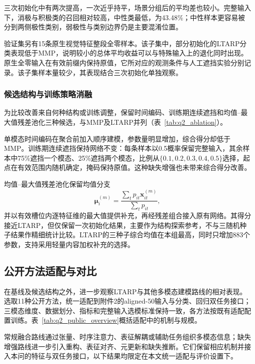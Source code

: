 \documentclass[UTF8,a4paper,11pt]{ctexart}
\newcommand{\QTwoParagraph}{\par\noindent\hspace*{2em}}
\newcounter{q2algorithm}
\begin{document}
\QTwoParagraph 三次初始化中有两次提高，一次近乎持平，场景分组后的平均差也较小。完整输入下，消极与积极类的召回相对较高，中性类最低，为43.48\%；中性样本更容易被分到两侧极性类别，弱极性与类别边界仍是主要混淆位置。

\QTwoParagraph 验证集另有15条原生视觉特征整段全零样本。该子集中，部分初始化的LTARP分类表现低于MMP，说明较小的总体平均收益可以与特殊输入上的退化同时出现。原生全零输入在有效前缀内保持原值，它所对应的观测条件与人工遮挡实验分别记录。该子集样本量较少，其表现结合三次初始化单独观察。

\subsubsection{候选结构与训练策略消融}
\QTwoParagraph 为比较改善来自何种结构或训练调整，保留时间编码、训练期连续遮挡和均值--最大值残差池化三种候选，与MMP及LTARP并列（表~\ref{tab:q2_ablation}）。



\QTwoParagraph 单模态时间编码在聚合前加入顺序建模，参数量明显增加，综合得分却低于MMP。训练期连续遮挡保持网络不变：每条样本以0.5概率保留完整输入，其余样本中75\%遮挡一个模态、25\%遮挡两个模态，比例从$\{0.1,0.2,0.3,0.4,0.5\}$选择，起点在有效范围内随机确定，掩码保持原值。这种缺失增强也未带来综合得分改善。

\QTwoParagraph 均值--最大值残差池化保留均值分支
\begin{equation}
\boldsymbol\mu_i^{(m)} = \frac{\sum_t p_{it}\mathbf x_{it}^{(m)}}{\sum_t p_{it}},
\end{equation}
并以有效槽位内逐特征维的最大值提供补充，再经残差组合接入原有网络。其得分接近LTARP，但仅保留一次初始化结果，主要作为结构探索参考，不与三随机种子结果作精细统计比较。LTARP的三种子综合均值在本组最高，同时只增加883个参数，支持采用轻量内容加权补充的选择。
\FloatBarrier

\subsection{公开方法适配与对比}\label{subsec:q2_public}
\QTwoParagraph 在基线及候选结构之外，进一步观察LTARP与其他多模态建模路线的相对表现。选取11种公开方法，统一适配到附件2的aligned-50输入与分类、回归双任务接口；三模态维度、数据划分、指标和完整输入选模标准保持一致，各方法按既有适配配置训练。表~\ref{tab:q2_public_overview}概括适配中的机制与规模。



\QTwoParagraph 常规融合路线通过张量、时序注意力、表征解耦或辅助任务组织多模态信息；缺失增强路线进一步引入重构、表征对齐、元更新和缺失推断。它们保留相应机制并接入本问的特征与双任务接口，以下结果均限定在本文统一适配与评价设置下。
\end{document}
